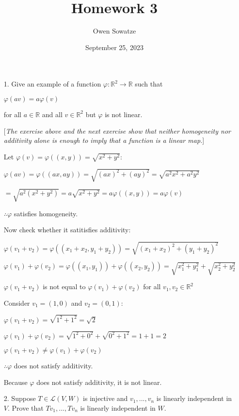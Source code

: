 \documentclass[fleqn]{article}
\title{Homework 3}
\author{Owen Sowatze}
\date{September 25, 2023}
\newcommand{\zerodisplayskip}{%
	\setlength{\abovedisplayskip}{0pt}%
	\setlength{\belowdisplayskip}{0pt}%
	\setlength{\abovedisplayshortskip}{0pt}%
	\setlength{\belowdisplayshortskip}{0pt}%
	\setlength{\mathindent}{0pt}}
\begin{document}
	
	\zerodisplayskip
	\doublespacing
	\maketitle
	
	\begin{enumerate}[nolistsep]
		\item[1.] Give an example of a function $\varphi : \mathbb{R}^2 \rightarrow \mathbb{R}$ such that
		
		\centerline{$\varphi(av) = a\varphi(v)$}
		
		for all $a \in \mathbb{R}$ and all $v \in \mathbb{R}^2$ but $\varphi$ is not linear.
		
		[\textit{The exercise above and the next exercise show that neither homogeneity nor additivity alone is enough to imply that a function is a linear map.}]
		
		Let $\varphi(v) = \varphi((x,y)) = \sqrt{x^2+y^2}$:
		
		$\varphi(av) = \varphi((ax,ay)) = \sqrt{(ax)^2 + (ay)^2} = \sqrt{a^2x^2 + a^2y^2}$
		
		$ = \sqrt{a^2(x^2 + y^2)} = a\sqrt{x^2+y^2} = a\varphi((x,y)) = a\varphi(v)$
		
		$\therefore \varphi$ satisfies homogeneity.
		
		Now check whether it satitisfies additivity:
		
		$\varphi(v_1+v_2) = \varphi((x_1+x_2,y_1+y_2)) = \sqrt{(x_1+x_2)^2 + (y_1+y_2)^2}$
		
		$\varphi(v_1) + \varphi(v_2) = \varphi((x_1,y_1)) + \varphi((x_2,y_2)) = \sqrt{x_1^2+y_1^2} + \sqrt{x_2^2+y_2^2}$
		
		$\varphi(v_1+v_2)$ is not equal to $\varphi(v_1) + \varphi(v_2)$ for all $v_1, v_2 \in \mathbb{R}^2$
		
		Consider $v_1 = (1, 0)$ and $v_2 = (0, 1)$:
		
		$\varphi(v_1+v_2) = \sqrt{1^2 + 1^2} = \sqrt{2}$
		
		$\varphi(v_1) + \varphi(v_2) = \sqrt{1^2 + 0^2} + \sqrt{0^2 + 1^2} = 1 + 1 = 2$
		
		$\varphi(v_1+v_2) \neq \varphi(v_1) + \varphi(v_2)$
		
		$\therefore \varphi$ does not satisfy additivity.
		
		Because $\varphi$ does not satisfy additivity, it is not linear.
		
		\pagebreak
		\item[2.] Suppose $T \in \mathcal{L}(V,W)$ is injective and $v_1,...,v_n$ is linearly independent in $V$. Prove that $Tv_1,...,Tv_n$ is linearly independent in $W$.
		

\end{enumerate}
\end{document}
